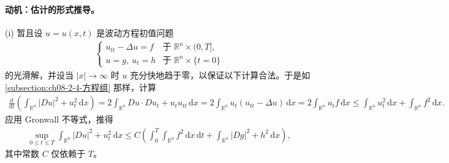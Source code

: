 \documentclass[../../main.tex]{subfiles}
\begin{document}
\paragraph{动机：估计的形式推导。}(i) 暂且设 $u=u(x,t)$ 是波动方程初值问题
\begin{align*}
\begin{cases}
u_{tt}-\Delta u=f & \text{于 } \mathbb{R}^n\times(0,T],\\
u=g,\ u_t=h & \text{于 } \mathbb{R}^n\times\{t=0\}
\end{cases}
\end{align*}
的光滑解，并设当 $|x|\to\infty$ 时 $u$ 充分快地趋于零，以保证以下计算合法。于是如\cref{subsection:ch08-2-4-方程组} 那样，计算
\begin{align*}
\frac{\mathrm{d}}{\mathrm{d}t}\left(\int_{\mathbb{R}^n}|Du|^2+u_t^2\,\mathrm{d}x\right)
=2\int_{\mathbb{R}^n}Du\cdot Du_t+u_tu_{tt}\,\mathrm{d}x
=2\int_{\mathbb{R}^n}u_t(u_{tt}-\Delta u)\,\mathrm{d}x
=2\int_{\mathbb{R}^n}u_t f\,\mathrm{d}x
\leqslant \int_{\mathbb{R}^n}u_t^2\,\mathrm{d}x+\int_{\mathbb{R}^n}f^2\,\mathrm{d}x.
\end{align*}
应用 Gronwall 不等式，推得
\begin{align}
\sup_{0\leqslant t\leqslant T}\int_{\mathbb{R}^n}|Du|^2+u_t^2\,\mathrm{d}x
\leqslant C\left(\int_0^T\int_{\mathbb{R}^n}f^2\,\mathrm{d}x\,\mathrm{d}t+\int_{\mathbb{R}^n}|Dg|^2+h^2\,\mathrm{d}x\right),\label{align:ch07-2-eq42}
\end{align}
其中常数 $C$ 仅依赖于 $T$。
\end{document}
